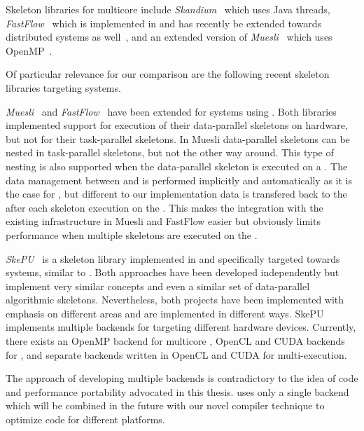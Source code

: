 Skeleton libraries for multicore \CPUs include \emph{Skandium}~\cite{LeytonP10} which uses Java threads, \emph{FastFlow}~\cite{AldinucciDaKiTo2011,AldinucciDKMT11} which is implemented in \Cpp and has recently be extended towards distributed systems as well~\cite{AldinucciCDKT12}, and an extended version of \emph{Muesli}~\cite{CiechanowiczK10} which uses OpenMP~\cite{OpenMP}.

Of particular relevance for our comparison are the following recent skeleton libraries targeting \GPU systems.

\emph{Muesli}~\cite{ErnstingK12} and \emph{FastFlow}~\cite{BuonoDLT13,AldinucciSDTP12} have been extended for \GPU systems using \CUDA.
Both libraries implemented support for execution of their data-parallel skeletons on \GPU hardware, but not for their task-parallel skeletons.
In Muesli data-parallel skeletons can be nested in task-parallel skeletons, but not the other way around.
This type of nesting is also supported when the data-parallel skeleton is executed on a \GPU.
The data management between \CPU and \GPU is performed implicitly and automatically as it is the case for \SkelCL, but different to our implementation data is transfered back to the \CPU after each skeleton execution on the \GPU.
This makes the integration with the existing infrastructure in Muesli and FastFlow easier but obviously limits performance when multiple skeletons are executed on the \GPU.

\bigskip

\emph{SkePU}~\cite{EnmyrenKe10,DastgeerEnKe2011,DastgeerKe14} is a skeleton library implemented in \Cpp and specifically targeted towards \GPU systems, similar to \SkelCL.
Both approaches have been developed independently but implement very similar concepts and even a similar set of data-parallel algorithmic skeletons.
Nevertheless, both projects have been implemented with emphasis on different areas and are implemented in different ways.
SkePU implements multiple backends for targeting different hardware devices.
Currently, there exists an OpenMP backend for multicore \CPUs, OpenCL and CUDA backends for \GPUs, and separate backends written in OpenCL and CUDA for multi-\GPU execution.

The approach of developing multiple backends is contradictory to the idea of code and performance portability advocated in this thesis.
\SkelCL uses only a single \OpenCL backend which will be combined in the future with our novel compiler technique to optimize code for different platforms.

